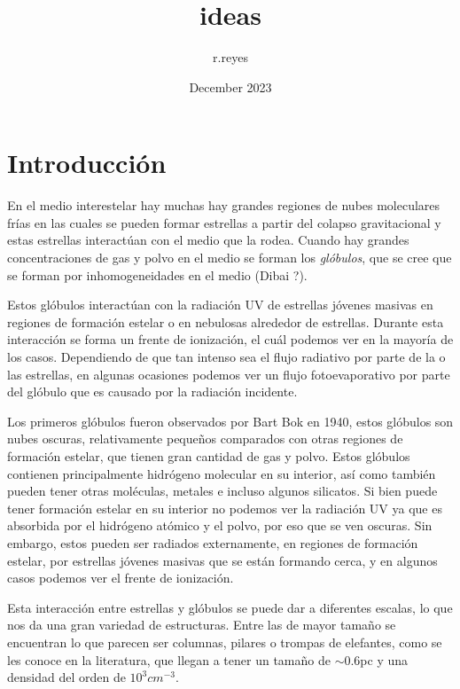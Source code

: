 \documentclass{article}
\title{ideas}
\author{r.reyes }
\date{December 2023}
\begin{document}
\maketitle

\section{Introducción}

En el medio interestelar hay muchas hay grandes regiones de nubes moleculares frías en las cuales se pueden formar estrellas a partir del colapso gravitacional y estas estrellas interactúan con el medio que la rodea. Cuando hay grandes concentraciones de gas y polvo en el medio se forman los \textit{glóbulos}, que se cree que se forman por inhomogeneidades en el medio (Dibai ?). 

Estos glóbulos interactúan con la radiación UV de estrellas jóvenes masivas en regiones de formación estelar o en nebulosas alrededor de estrellas. Durante esta interacción se forma un frente de ionización, el cuál podemos ver en la mayoría de los casos. Dependiendo de que tan intenso sea el flujo radiativo por parte de la o las estrellas, en algunas ocasiones podemos ver un flujo fotoevaporativo por parte del glóbulo que es causado por la radiación incidente.

Los primeros glóbulos fueron observados por Bart Bok en 1940, estos glóbulos son nubes oscuras, relativamente pequeños comparados con otras regiones de formación estelar, que tienen gran cantidad de gas y polvo. Estos glóbulos contienen principalmente hidrógeno molecular en su interior, así como también pueden tener otras moléculas, metales e incluso algunos silicatos. Si bien puede tener formación estelar en su interior no podemos ver la radiación UV ya que es absorbida por el hidrógeno atómico y el polvo, por eso que se ven oscuras. Sin embargo, estos pueden ser radiados externamente, en regiones de formación estelar, por estrellas jóvenes masivas que se están formando cerca, y en algunos casos podemos ver el frente de ionización.

Esta interacción entre estrellas y glóbulos se puede dar a diferentes escalas, lo que nos da una gran variedad de estructuras. Entre las de mayor tamaño se encuentran lo que parecen ser columnas, pilares o trompas de elefantes, como se les conoce en la literatura, que llegan a tener un tamaño de $\sim0.6$pc y una densidad del orden de $10^3cm^{-3}$. 
\end{document}
